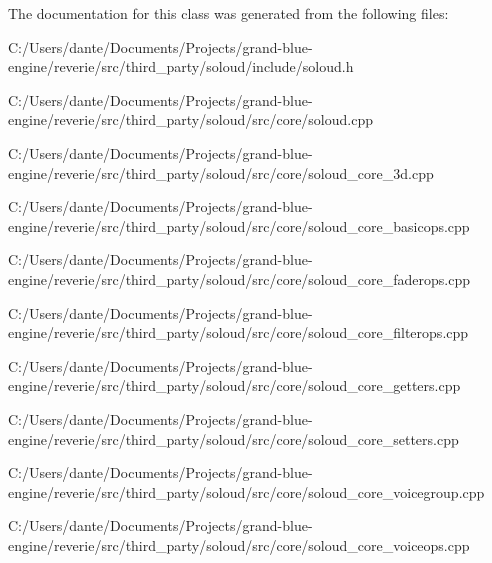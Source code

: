 

The documentation for this class was generated from the following files\+:\begin{DoxyCompactItemize}
\item 
C\+:/\+Users/dante/\+Documents/\+Projects/grand-\/blue-\/engine/reverie/src/third\+\_\+party/soloud/include/soloud.\+h\item 
C\+:/\+Users/dante/\+Documents/\+Projects/grand-\/blue-\/engine/reverie/src/third\+\_\+party/soloud/src/core/soloud.\+cpp\item 
C\+:/\+Users/dante/\+Documents/\+Projects/grand-\/blue-\/engine/reverie/src/third\+\_\+party/soloud/src/core/soloud\+\_\+core\+\_\+3d.\+cpp\item 
C\+:/\+Users/dante/\+Documents/\+Projects/grand-\/blue-\/engine/reverie/src/third\+\_\+party/soloud/src/core/soloud\+\_\+core\+\_\+basicops.\+cpp\item 
C\+:/\+Users/dante/\+Documents/\+Projects/grand-\/blue-\/engine/reverie/src/third\+\_\+party/soloud/src/core/soloud\+\_\+core\+\_\+faderops.\+cpp\item 
C\+:/\+Users/dante/\+Documents/\+Projects/grand-\/blue-\/engine/reverie/src/third\+\_\+party/soloud/src/core/soloud\+\_\+core\+\_\+filterops.\+cpp\item 
C\+:/\+Users/dante/\+Documents/\+Projects/grand-\/blue-\/engine/reverie/src/third\+\_\+party/soloud/src/core/soloud\+\_\+core\+\_\+getters.\+cpp\item 
C\+:/\+Users/dante/\+Documents/\+Projects/grand-\/blue-\/engine/reverie/src/third\+\_\+party/soloud/src/core/soloud\+\_\+core\+\_\+setters.\+cpp\item 
C\+:/\+Users/dante/\+Documents/\+Projects/grand-\/blue-\/engine/reverie/src/third\+\_\+party/soloud/src/core/soloud\+\_\+core\+\_\+voicegroup.\+cpp\item 
C\+:/\+Users/dante/\+Documents/\+Projects/grand-\/blue-\/engine/reverie/src/third\+\_\+party/soloud/src/core/soloud\+\_\+core\+\_\+voiceops.\+cpp\end{DoxyCompactItemize}
